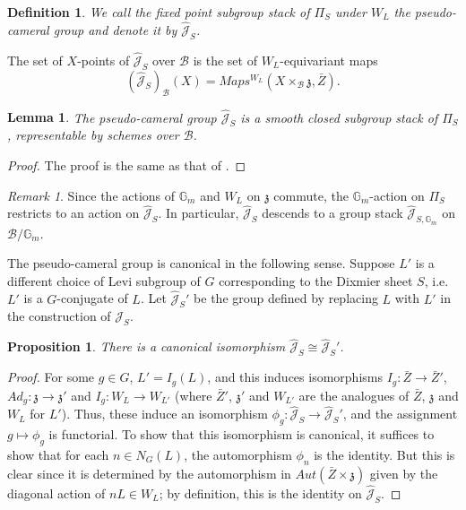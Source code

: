 \documentclass{amsart}
\newtheorem{lemma}[theorem]{Lemma}
\newtheorem{proposition}[theorem]{Proposition}
\newtheorem{definition}[theorem]{Definition}
\theoremstyle{remark}
\newtheorem{remark}[theorem]{Remark}
\numberwithin{theorem}{section}
\numberwithin{equation}{section}
\begin{document}
\begin{definition}\label{PseudoCameralgpdef}
    We call the fixed point subgroup stack of $\Pi_S$ under $W_L$ the \emph{pseudo-cameral group} and denote it by $\hat{\mathcal J}_S$.
\end{definition}

The set of $X$-points of $\hat{\mathcal J}_S$ over $\mathcal B$ is the set of $W_L$-equivariant maps
\begin{equation}\label{PseudoCameralgpeqn}
    (\hat{\mathcal{J}}_S)_{\mathcal B}(X) = Maps^{W_L}(X \times_{\mathcal B} \mathfrak{z}, \bar{Z}).
\end{equation}

\begin{lemma}\label{PseudoCameralgplem}
    The pseudo-cameral group $\hat{\mathcal J}_S$ is a smooth closed subgroup stack of $\Pi_S$, representable by schemes over $\mathcal B$.
\end{lemma}

\begin{proof} 
The proof is the same as that of \cite[Lemme 2.4.1]{Ngo2}.
\end{proof}

\begin{remark}\label{PseudoCameralgprmk}
    Since the actions of $\mathbb{G}_m$ and $W_L$ on $\mathfrak{z}$ commute, the $\mathbb{G}_m$-action on $\Pi_S$ restricts to an action on $\hat{\mathcal J}_S$. In particular, $\hat{\mathcal J}_S$ descends to a group stack $\hat{\mathcal J}_{S, \mathbb{G}_m}$ on $\mathcal B/\mathbb{G}_m$.
\end{remark}

The pseudo-cameral group is canonical in the following sense. Suppose $L'$ is a different choice of Levi subgroup of $G$ corresponding to the Dixmier sheet $S$, i.e. $L'$ is a $G$-conjugate of $L$. Let $\hat{\mathcal J}_S'$ be the group defined by replacing $L$ with $L'$ in the construction of $\mathcal J_S$.

\begin{proposition}\label{PseudoCameralLIndprp}
    There is a canonical isomorphism $\hat{\mathcal J}_S \cong \hat{\mathcal J}_S'$.
\end{proposition}

\begin{proof}
For some $g \in G$, $L' = I_g(L)$, and this induces isomorphisms $I_g:\bar{Z} \rightarrow \bar{Z}'$, $Ad_g:\mathfrak{z} \rightarrow \mathfrak{z}'$ and $I_g:W_L \rightarrow W_{L'}$ (where $\bar{Z}'$, $\mathfrak{z}'$ and $W_{L'}$ are the analogues of $\bar{Z}$, $\mathfrak{z}$ and $W_L$ for $L'$). Thus, these induce an isomorphism $\phi_g:\hat{\mathcal J}_S \rightarrow \hat{\mathcal J}_S'$, and the assignment $g \mapsto \phi_g$ is functorial. To show that this isomorphism is canonical, it suffices to show that for each $n \in N_G(L)$, the automorphism $\phi_n$ is the identity. But this is clear since it is determined by the automorphism in $Aut(\bar{Z} \times \mathfrak{z})$ given by the diagonal action of $nL \in W_L$; by definition, this is the identity on $\hat{\mathcal J}_S$.
\end{proof}
\end{document}
